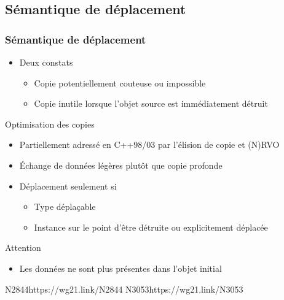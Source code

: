 \documentclass[C++.tex]{subfiles}
\begin{document}
\subsection*{Sémantique de déplacement}
\begin{frame}
	\frametitle{Sémantique de déplacement}
	\begin{itemize}
		\item Deux constats
		\begin{itemize}
			\item Copie potentiellement couteuse ou impossible


			\item Copie inutile lorsque l'objet source est immédiatement détruit
		\end{itemize}
	\end{itemize}

	\begin{block}{Optimisation des copies}
		\begin{itemize}
			\item Partiellement adressé en C++98/03 par l'élision de copie et (N)RVO
		\end{itemize}
	\end{block}

	\begin{itemize}
		\item Échange de données légères plutôt que copie profonde
		\item Déplacement seulement si
		\begin{itemize}
			\item Type déplaçable
			\item Instance sur le point d'être détruite ou explicitement déplacée
		\end{itemize}
	\end{itemize}

	\begin{alertblock}{Attention}
		\begin{itemize}
			\item Les données ne sont plus présentes dans l'objet initial
		\end{itemize}
	\end{alertblock}

		{N2844}{https://wg21.link/N2844}
		{N3053}{https://wg21.link/N3053}
\end{frame}
\end{document}
